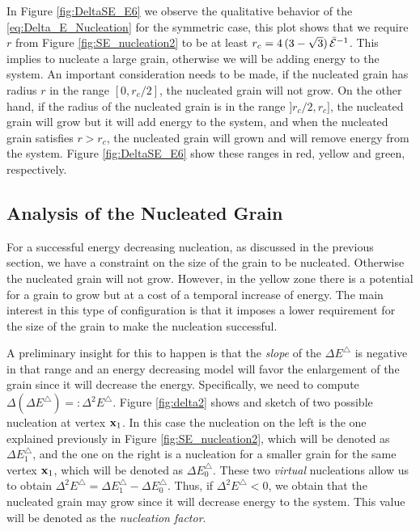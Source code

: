 In Figure \ref{fig:DeltaSE_E6} we observe
the qualitative behavior of the \eqref{eq:Delta_E_Nucleation} for the symmetric case, this plot shows that we require $r$ from Figure \eqref{fig:SE_nucleation2} to be at least $r_c=4\,(3 - \sqrt{3})\,\bar{\mathcal{E}}^{-1}$.
This implies to nucleate a large grain,
otherwise we will be adding energy to the system.
An important consideration needs to be made,
if the nucleated grain has radius $r$ in the range
$[0,r_c/2]$, the nucleated grain will not grow.
On the other hand, if the radius of the nucleated grain is 
in the range $]r_c/2,r_c]$,
the nucleated grain will grow but it will add
energy to the system,
and when the nucleated grain satisfies $r>r_c$,
the nucleated grain will grown and will
remove energy from the system.
Figure \ref{fig:DeltaSE_E6} show
these ranges in red, yellow and green, respectively.

\subsection{Analysis of the Nucleated Grain}

For a successful energy decreasing nucleation, as discussed in
the previous section, we have a constraint on the size
of the grain to be nucleated.
Otherwise the nucleated grain will not grow. 
However, 
in the yellow zone there is a potential for a grain to grow
but at a cost of a temporal increase of energy.
The main interest in this type of configuration
is that it imposes a lower requirement for the size 
of the grain to make the nucleation successful.

A preliminary insight for this to happen is that
the \emph{slope} of the $\Delta E^{\triangle}$ is 
negative in that range and an energy decreasing model 
will favor the enlargement of the grain since it will
decrease the energy.
Specifically, we need to compute $\Delta(\Delta E^{\triangle})=:\Delta^2 E^{\triangle}$.
Figure \ref{fig:delta2} shows and sketch of two possible nucleation at vertex $\x_1$.
In this case the nucleation on the left is the
one explained previously in Figure \ref{fig:SE_nucleation2},
which will be denoted as $\Delta E^{\triangle}_1$,
and the one on the right is a nucleation
for a smaller grain for the same vertex $\x_1$,
which will be denoted as $\Delta E^{\triangle}_0$.
These two \emph{virtual} nucleations allow us
to obtain $\Delta^2 E^{\triangle}=\Delta E^{\triangle}_1-\Delta E^{\triangle}_0$.
Thus, if $\Delta^2 E^{\triangle}<0$, we obtain
that the nucleated grain may grow
since it will decrease energy to the system.
This value will be denoted as the \emph{nucleation
factor}.

